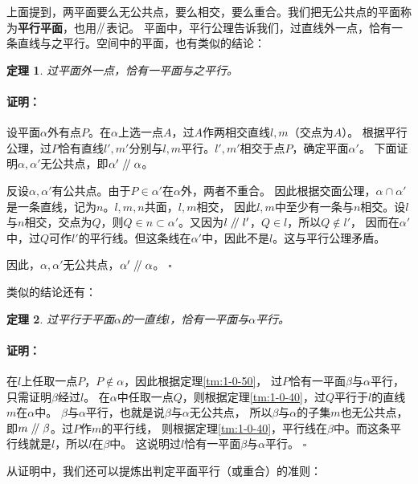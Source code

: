 \documentclass[12pt,UTF8]{ctexbook}
\newtheorem{tm}{定理}[section]
\renewenvironment{proof}{\paragraph{\textbf{证明：}}}{\hfill$\square$}
\renewcommand\parallel{\mathrel{/\mskip-4mu/}}
\begin{document}
上面提到，两平面要么无公共点，要么相交，要么重合。我们把无公共点的平面称为\textbf{平行平面}，也用$\parallel$表记。
平面中，平行公理告诉我们，过直线外一点，恰有一条直线与之平行。空间中的平面，也有类似的结论：
\begin{tm}
    过平面外一点，恰有一平面与之平行。
\end{tm}\label{tm:1-0-50}
\begin{proof}
    设平面$\alpha$外有点$P$。在$\alpha$上选一点$A$，过$A$作两相交直线$l,m$（交点为$A$）。
    根据平行公理，过$P$恰有直线$l', m'$分别与$l,m$平行。$l',m'$相交于点$P$，确定平面$\alpha'$。
    下面证明$\alpha,\alpha'$无公共点，即$\alpha'\parallel\alpha$。

    反设$\alpha,\alpha'$有公共点。由于$P\in\alpha'$在$\alpha$外，两者不重合。
    因此根据交面公理，$\alpha \cap \alpha'$是一条直线，记为$n$。$l,m,n$共面，$l,m$相交，
    因此$l,m$中至少有一条与$n$相交。设$l$与$n$相交，交点为$Q$，则$Q\in n\subset\alpha'$。又因为$l\parallel l'$，$Q\in l$，所以$Q\notin l'$，
    因而在$\alpha'$中，过$Q$可作$l'$的平行线。但这条线在$\alpha'$中，因此不是$l$。这与平行公理矛盾。
        
    因此，$\alpha,\alpha'$无公共点，$\alpha'\parallel\alpha$。
\end{proof}

类似的结论还有：

\begin{tm}\label{tm:1-0-60}
    过平行于平面$\alpha$的一直线$l$，恰有一平面与$\alpha$平行。
\end{tm}
\begin{proof}
在$l$上任取一点$P$，$P\notin \alpha$，因此根据定理\ref{tm:1-0-50}，
过$P$恰有一平面$\beta$与$\alpha$平行，只需证明$\beta$经过$l$。
在$\alpha$中任取一点$Q$，则根据定理\ref{tm:1-0-40}，过$Q$平行于$l$的直线$m$在$\alpha$中。
$\beta$与$\alpha$平行，也就是说$\beta$与$\alpha$无公共点，
所以$\beta$与$\alpha$的子集$m$也无公共点，即$m\parallel \beta$。过$P$作$m$的平行线，
则根据定理\ref{tm:1-0-40}，平行线在$\beta$中。而这条平行线就是$l$，所以$l$在$\beta$中。
这说明过$l$恰有一平面$\beta$与$\alpha$平行。
\end{proof}

从证明中，我们还可以提炼出判定平面平行（或重合）的准则：
\end{document}
